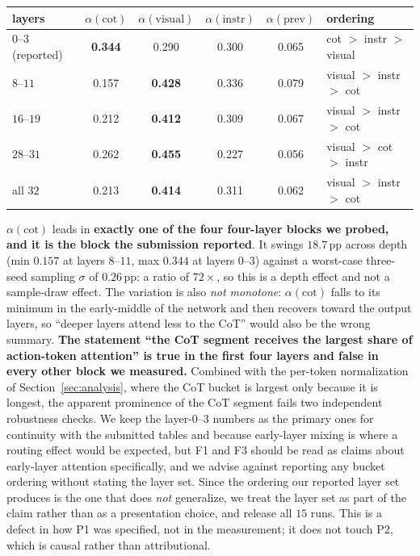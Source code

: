 \documentclass{article}
\begin{document}
\begin{center}\small
\begin{tabular}{lccccl}
\toprule
layers & $\alpha(\text{cot})$ & $\alpha(\text{visual})$ & $\alpha(\text{instr})$ & $\alpha(\text{prev})$ & ordering \\
\midrule
$0$--$3$ (reported)   & \textbf{0.344} & 0.290 & 0.300 & 0.065 & cot $>$ instr $>$ visual \\
$8$--$11$             & 0.157 & \textbf{0.428} & 0.336 & 0.079 & visual $>$ instr $>$ cot \\
$16$--$19$            & 0.212 & \textbf{0.412} & 0.309 & 0.067 & visual $>$ instr $>$ cot \\
$28$--$31$            & 0.262 & \textbf{0.455} & 0.227 & 0.056 & visual $>$ cot $>$ instr \\
all $32$              & 0.213 & \textbf{0.414} & 0.311 & 0.062 & visual $>$ instr $>$ cot \\
\bottomrule
\end{tabular}
\end{center}

\noindent$\alpha(\text{cot})$ leads in \textbf{exactly one of the four four-layer blocks we probed, and it is the block the submission reported}. It swings $18.7$\,pp across depth (min $0.157$ at layers $8$--$11$, max $0.344$ at layers $0$--$3$) against a worst-case three-seed sampling $\sigma$ of $0.26$\,pp: a ratio of $72\times$, so this is a depth effect and not a sample-draw effect. The variation is also \emph{not monotone}: $\alpha(\text{cot})$ falls to its minimum in the early-middle of the network and then recovers toward the output layers, so ``deeper layers attend less to the CoT'' would also be the wrong summary. \textbf{The statement ``the CoT segment receives the largest share of action-token attention'' is true in the first four layers and false in every other block we measured.} Combined with the per-token normalization of Section~\ref{sec:analysis}, where the CoT bucket is largest only because it is longest, the apparent prominence of the CoT segment fails two independent robustness checks. We keep the layer-$0$--$3$ numbers as the primary ones for continuity with the submitted tables and because early-layer mixing is where a routing effect would be expected, but F1 and F3 should be read as claims about early-layer attention specifically, and we advise against reporting any bucket ordering without stating the layer set. Since the ordering our reported layer set produces is the one that does \emph{not} generalize, we treat the layer set as part of the claim rather than as a presentation choice, and release all $15$ runs. This is a defect in how P1 was specified, not in the measurement; it does not touch P2, which is causal rather than attributional.
\end{document}
